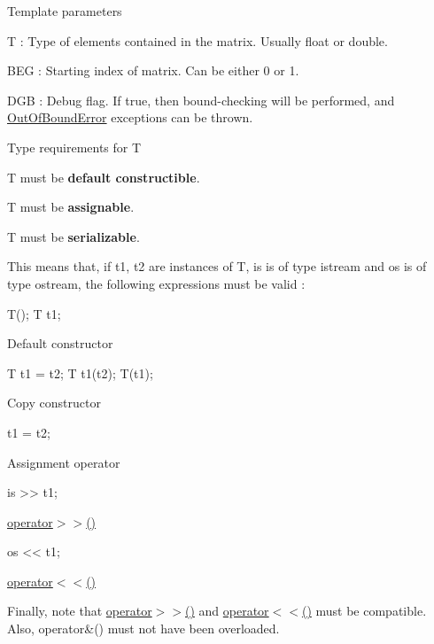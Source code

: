 \begin{DoxyParagraph}{Template parameters}

\begin{DoxyItemize}
\item {\ttfamily T} \+: Type of elements contained in the matrix. Usually {\ttfamily float} or {\ttfamily double}.
\item {\ttfamily B\+EG} \+: Starting index of matrix. Can be either 0 or 1.
\item {\ttfamily D\+GB} \+: Debug flag. If {\ttfamily true}, then bound-\/checking will be performed, and {\ttfamily \mbox{\hyperlink{structKalman_1_1OutOfBoundError}{Out\+Of\+Bound\+Error}}} exceptions can be thrown.
\end{DoxyItemize}
\end{DoxyParagraph}
\begin{DoxyParagraph}{Type requirements for T}

\begin{DoxyItemize}
\item {\ttfamily T} must be {\bfseries default constructible}.
\item {\ttfamily T} must be {\bfseries assignable}.
\item {\ttfamily T} must be {\bfseries serializable}.
\end{DoxyItemize}This means that, if {\ttfamily t1}, {\ttfamily t2} are instances of {\ttfamily T}, {\ttfamily is} is of type {\ttfamily istream} and {\ttfamily os} is of type {\ttfamily ostream}, the following expressions must be valid \+:
\begin{DoxyItemize}
\item 
\begin{DoxyCode}
T(); T t1; 
\end{DoxyCode}
 Default constructor
\item 
\begin{DoxyCode}
T t1 = t2; T t1(t2); T(t1); 
\end{DoxyCode}
 Copy constructor
\item 
\begin{DoxyCode}
t1 = t2; 
\end{DoxyCode}
 Assignment operator
\item 
\begin{DoxyCode}
is >> t1; 
\end{DoxyCode}
 {\ttfamily \mbox{\hyperlink{namespaceKalman_a72ce00e837fa126ab3961f879e3d8b87}{operator$>$$>$()}}} 
\item 
\begin{DoxyCode}
os << t1; 
\end{DoxyCode}
 {\ttfamily \mbox{\hyperlink{namespaceKalman_a531684dadbec9b34313492f6d5121598}{operator$<$$<$()}}} 
\end{DoxyItemize}Finally, note that {\ttfamily \mbox{\hyperlink{namespaceKalman_a72ce00e837fa126ab3961f879e3d8b87}{operator$>$$>$()}}} and {\ttfamily \mbox{\hyperlink{namespaceKalman_a531684dadbec9b34313492f6d5121598}{operator$<$$<$()}}} must be compatible. Also, {\ttfamily operator\&()} must not have been overloaded. 
\end{DoxyParagraph}


